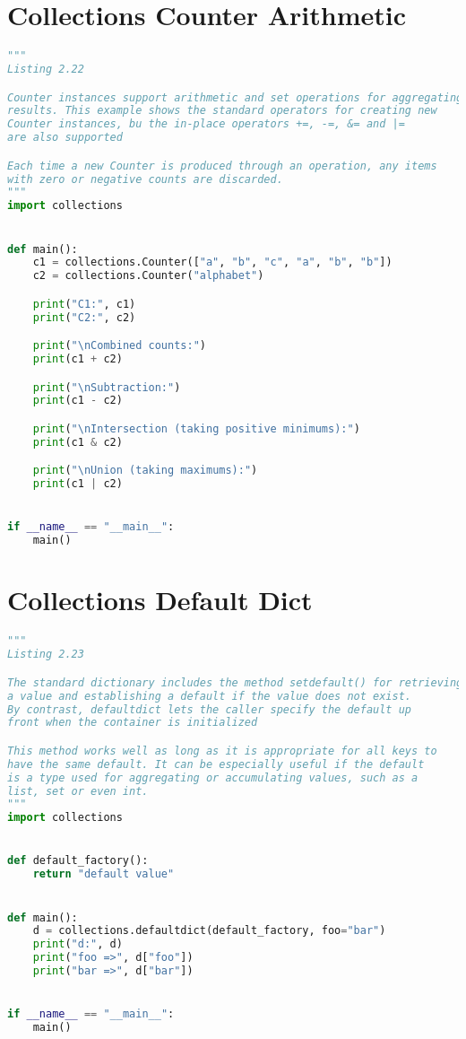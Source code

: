 \documentclass[a4paper,landscape]{report}
\begin{document}
\section{Collections Counter Arithmetic}
\begin{lstlisting}[language=Python]
"""
Listing 2.22

Counter instances support arithmetic and set operations for aggregating
results. This example shows the standard operators for creating new
Counter instances, bu the in-place operators +=, -=, &= and |=
are also supported

Each time a new Counter is produced through an operation, any items
with zero or negative counts are discarded.
"""
import collections


def main():
    c1 = collections.Counter(["a", "b", "c", "a", "b", "b"])
    c2 = collections.Counter("alphabet")

    print("C1:", c1)
    print("C2:", c2)

    print("\nCombined counts:")
    print(c1 + c2)

    print("\nSubtraction:")
    print(c1 - c2)

    print("\nIntersection (taking positive minimums):")
    print(c1 & c2)

    print("\nUnion (taking maximums):")
    print(c1 | c2)


if __name__ == "__main__":
    main()

\end{lstlisting}
\section{Collections Default Dict}
\begin{lstlisting}[language=Python]
"""
Listing 2.23

The standard dictionary includes the method setdefault() for retrieving
a value and establishing a default if the value does not exist.
By contrast, defaultdict lets the caller specify the default up
front when the container is initialized

This method works well as long as it is appropriate for all keys to
have the same default. It can be especially useful if the default
is a type used for aggregating or accumulating values, such as a
list, set or even int.
"""
import collections


def default_factory():
    return "default value"


def main():
    d = collections.defaultdict(default_factory, foo="bar")
    print("d:", d)
    print("foo =>", d["foo"])
    print("bar =>", d["bar"])


if __name__ == "__main__":
    main()

\end{lstlisting}
\end{document}
